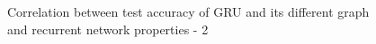 \begin{figure}[H]
\caption[Correlation between test accuracy of GRU and its different graph and recurrent network properties - 2]{Correlation between test accuracy of GRU and its different graph and recurrent network properties - 2} \label{fig:gru_correlation_2}
\end{figure}
